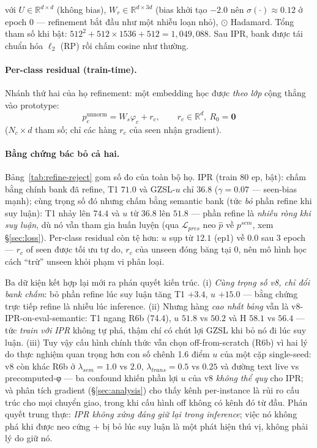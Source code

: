 \documentclass[10pt,twocolumn,letterpaper]{article}
\newcommand{\R}{\mathbb{R}}
\newcommand{\phat}{\hat{p}}
\begin{document}
với $U\in\R^{d\times d}$ (không bias), $W_r\in\R^{d\times 3d}$ (bias khởi tạo $-2.0$ nên $\sigma(\cdot)\approx 0.12$ ở epoch 0 — refinement bắt đầu như một nhiễu loạn nhỏ), $\odot$ Hadamard. Tổng tham số khi bật: $512^2 + 512{\times}1536 + 512 = 1{,}049{,}088$. Sau IPR, bank được tái chuẩn hóa $\ell_2$ (RP) rồi chấm cosine như thường.

\paragraph{Per-class residual (train-time).}
Nhánh thứ hai của họ refinement: một embedding học được \emph{theo lớp} cộng thẳng vào prototype:
\begin{equation}
p_c^{\text{unnorm}} = W_s\varphi_c + r_c,\qquad r_c\in\R^{d},\ R_0=\mathbf 0
\label{eq:residual}
\end{equation}
($N_c \times d$ tham số; chỉ các hàng $r_c$ của seen nhận gradient).

\paragraph{Bằng chứng bác bỏ cả hai.}
Bảng~\ref{tab:refine-reject} gom số đo của toàn bộ họ. IPR (train 80 ep, bật): chấm bằng chính bank đã refine, T1 $71.0$ và GZSL-$u$ chỉ $36.8$ ($\gamma{=}0.07$ — seen-bias mạnh); cùng trọng số đó nhưng chấm bằng semantic bank (tức \emph{bỏ} phần refine khi suy luận): T1 nhảy lên $74.4$ và $u$ từ $36.8$ lên $51.8$ — phần refine là \emph{nhiễu ròng khi suy luận}, dù nó vẫn tham gia huấn luyện (qua $\mathcal L_{pres}$ neo $\phat$ về $p^{sem}$, xem §\ref{sec:loss}). Per-class residual còn tệ hơn: $u$ sụp từ $12.1$ (ep1) về $0.0$ sau 3 epoch — $r_c$ of seen được tối ưu tự do, $r_c$ của unseen đóng băng tại $0$, nên mô hình học cách ``trừ'' unseen khỏi phạm vi phân loại.

Ba dữ kiện kết hợp lại mới ra phán quyết kiến trúc. (i) \emph{Cùng trọng số v8, chỉ đổi bank chấm}: bỏ phần refine lúc suy luận tăng T1 $+3.4$, $u$ $+15.0$ — bằng chứng trực tiếp refine là nhiễu lúc inference. (ii) Nhưng hàng \emph{cao nhất bảng} vẫn là v8-IPR-on-eval-semantic: T1 ngang R6b (74.4), $u$ $51.8$ vs $50.2$ và H $58.1$ vs $56.4$ — tức \emph{train với IPR} không tự phá, thậm chí có chút lợi GZSL khi bỏ nó đi lúc suy luận. (iii) Tuy vậy cấu hình chính thức vẫn chọn off-from-scratch (R6b) vì hai lý do thực nghiệm quan trọng hơn con số chênh 1.6 điểm $u$ của một cặp single-seed: v8 còn khác R6b ở $\lambda_{sem}{=}1.0$ vs $2.0$, $\lambda_{trans}{=}0.5$ vs $0.25$ và đường text live vs precomputed-φ — ba confound khiến phần lợi $u$ của v8 \emph{không thể quy} cho IPR; và phân tích gradient (§\ref{sec:analysis}) cho thấy kênh per-instance là rủi ro cấu trúc cho mọi chuyển giao, trong khi cấu hình off không có kênh đó từ đầu. Phán quyết trung thực: \emph{IPR không xứng đáng giữ lại trong inference}; việc nó không phá khi được neo cứng + bị bỏ lúc suy luận là một phát hiện thú vị, không phải lý do giữ nó.
\end{document}
